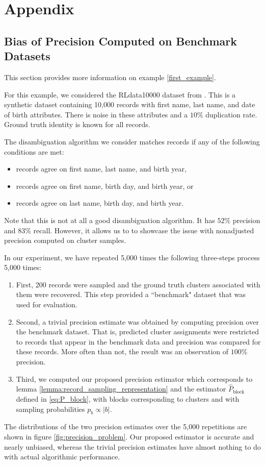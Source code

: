 \documentclass[fontsize=11pt]{article}
\theoremstyle{definition}
\begin{document}
\section{Appendix}\label{sec:appendix}

\subsection{Bias of Precision Computed on Benchmark Datasets}\label{appendix:example}

This section provides more information on example \ref{first_example}.

For this example, we considered the RLdata10000 dataset from \cite{RecordLinkage}. This is a synthetic dataset containing 10,000 records with first name, last name, and date of birth attributes. There is noise in these attributes and a $10\%$ duplication rate. Ground truth identity is known for all records.

The disambiguation algorithm we consider matches records if any of the following conditions are met:
\begin{itemize}
    \item records agree on first name, last name, and birth year,
    \item records agree on first name, birth day, and birth year, or
    \item records agree on last name, birth day, and birth year.
\end{itemize}
Note that this is not at all a good disambiguation algorithm. It has $52\%$ precision and $83\%$ recall. However, it allows us to to showcase the issue with nonadjusted precision computed on cluster samples.

In our experiment, we have repeated 5,000 times the following three-steps process 5,000 times:
\begin{enumerate}
    \item First, 200 records were sampled and the ground truth clusters associated with them were recovered. This step provided a ``benchmark" dataset that was used for evaluation.
    \item Second, a trivial precision estimate was obtained by computing precision over the benchmark dataset. That is, predicted cluster assignments were restricted to records that appear in the benchmark data and precision was compared for these records. More often than not, the result was an observation of $100\%$ precision.
    \item Third, we computed our proposed precision estimator which corresponds to lemma \ref{lemma:record_sampling_representation} and the estimator $\widehat P_{\text{block}}$ defined in \eqref{eq:P_block}, with blocks corresponding to clusters and with sampling probabilities $p_b \propto \lvert b \rvert$.
\end{enumerate}
The distributions of the two precision estimates over the 5,000 repetitions are shown in figure \ref{fig:precision_problem}. Our proposed estimator is accurate and nearly unbiased, whereas the trivial precision estimates have almost nothing to do with actual algorithmic performance.
\end{document}
